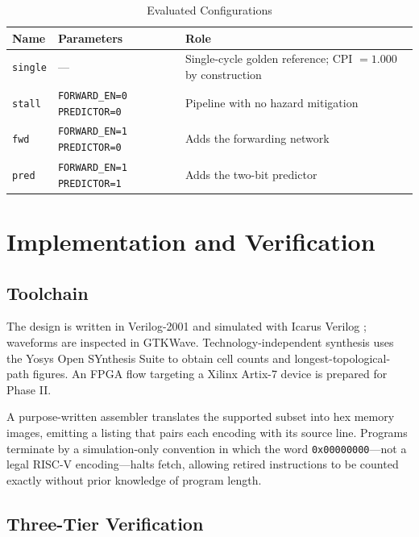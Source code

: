 \documentclass[conference]{IEEEtran}
\begin{document}
\begin{table}[htbp]
\caption{Evaluated Configurations}
\begin{center}
\begin{tabular}{llp{3.6cm}}
\toprule
\textbf{Name} & \textbf{Parameters} & \textbf{Role} \\
\midrule
\texttt{single} & --- & Single-cycle golden reference; CPI $=1.000$ by construction \\
\texttt{stall}  & \texttt{FORWARD\_EN=0} \texttt{PREDICTOR=0} & Pipeline with no hazard mitigation \\
\texttt{fwd}    & \texttt{FORWARD\_EN=1} \texttt{PREDICTOR=0} & Adds the forwarding network \\
\texttt{pred}   & \texttt{FORWARD\_EN=1} \texttt{PREDICTOR=1} & Adds the two-bit predictor \\
\bottomrule
\end{tabular}
\label{tab:configs}
\end{center}
\end{table}

\section{Implementation and Verification}

\subsection{Toolchain}

The design is written in Verilog-2001 and simulated with Icarus Verilog
\cite{iverilog}; waveforms are inspected in GTKWave. Technology-independent
synthesis uses the Yosys Open SYnthesis Suite \cite{yosys} to obtain cell
counts and longest-topological-path figures. An FPGA flow targeting a
Xilinx Artix-7 device is prepared for Phase II.

A purpose-written assembler translates the supported subset into hex memory
images, emitting a listing that pairs each encoding with its source line.
Programs terminate by a simulation-only convention in which the word
\texttt{0x00000000}---not a legal RISC-V encoding---halts fetch, allowing
retired instructions to be counted exactly without prior knowledge of
program length.

\subsection{Three-Tier Verification}
\end{document}
